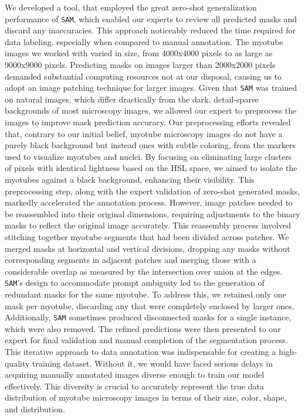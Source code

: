 We developed a tool, that employed the great zero-shot generalization performance of \texttt{SAM}, which enabled our experts to review all predicted masks and discard any inaccuracies. This approach noticeably reduced the time required for data labeling, especially when compared to manual annotation. The myotube images we worked with varied in size, from 4000x4000 pixels to as large as 9000x9000 pixels. Predicting masks on images larger than 2000x2000 pixels demanded substantial computing resources not at our disposal, causing us to adopt an image patching technique for larger images.
Given that \texttt{SAM} was trained on natural images, which differ drastically from the dark, detail-sparse backgrounds of most microscopy images, we allowed our expert to preprocess the images to improve mask prediction accuracy. Our preprocessing efforts revealed that, contrary to our initial belief, myotube microscopy images do not have a purely black background but instead ones with subtle coloring, from the markers used to visualize myotubes and nuclei. By focusing on eliminating large clusters of pixels with identical lightness based on the HSL space, we aimed to isolate the myotubes against a black background, enhancing their visibility. This preprocessing step, along with the expert validation of zero-shot generated masks, markedly accelerated the annotation process.
However, image patches needed to be reassembled into their original dimensions, requiring adjustments to the binary masks to reflect the original image accurately. This reassembly process involved stitching together myotube segments that had been divided across patches. We merged masks at horizontal and vertical divisions, dropping any masks without corresponding segments in adjacent patches and merging those with a considerable overlap as measured by the intersection over union at the edges.
\texttt{SAM}'s design to accommodate prompt ambiguity led to the generation of redundant masks for the same myotube. To address this, we retained only one mask per myotube, discarding any that were completely enclosed by larger ones. Additionally, \texttt{SAM} sometimes produced disconnected masks for a single instance, which were also removed.
The refined predictions were then presented to our expert for final validation and manual completion of the segmentation process. This iterative approach to data annotation was indispensable for creating a high-quality training dataset. Without it, we would have faced serious delays in acquiring manually annotated images diverse enough to train our model effectively. This diversity is crucial to accurately represent the true data distribution of myotube microscopy images in terms of their size, color, shape, and distribution.

